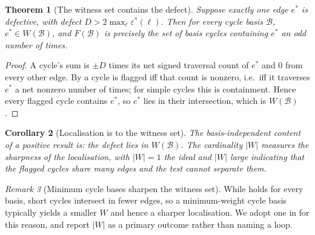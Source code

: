 \documentclass[11pt,twocolumn,a4paper]{article}
\theoremstyle{pstyle}
\newtheorem{theorem}{Theorem}[section]
\newtheorem{corollary}[theorem]{Corollary}
\theoremstyle{definition}
\theoremstyle{remark}
\newtheorem{remark}[theorem]{Remark}
\newcommand{\abs}[1]{\lvert#1\rvert}
\newcommand{\eps}{\varepsilon}
\newcommand{\epsstar}{\eps^{\ast}}
\begin{document}
\begin{theorem}[The witness set contains the defect]
\label{thm:witness-contains}
Suppose exactly one edge $e^{\ast}$ is defective, with defect $D >
2\max_\ell \epsstar(\ell)$. Then for every cycle basis $\mathcal{B}$,
$e^{\ast}\in W(\mathcal{B})$, and $F(\mathcal{B})$ is precisely the set
of basis cycles containing $e^{\ast}$ an odd number of times.
\end{theorem}

\begin{proof}
A cycle's sum is $\pm D$ times its net signed traversal count of
$e^{\ast}$ and $0$ from every other edge. By  a
cycle is flagged iff that count is nonzero, i.e.\ iff it traverses
$e^{\ast}$ a net nonzero number of times; for simple cycles this is
containment. Hence every flagged cycle contains $e^{\ast}$, so
$e^{\ast}$ lies in their intersection, which is $W(\mathcal{B})$.
\end{proof}

\begin{corollary}[Localisation is to the witness set]
\label{cor:localise-witness}
The basis-independent content of a positive result is: the defect lies
in $W(\mathcal{B})$. The cardinality $\abs{W}$ measures the sharpness of
the localisation, with $\abs{W}=1$ the ideal and $\abs{W}$ large
indicating that the flagged cycles share many edges and the test cannot
separate them.
\end{corollary}

\begin{remark}[Minimum cycle bases sharpen the witness set]
\label{rem:mcb}
While  holds for every basis, short cycles
intersect in fewer edges, so a minimum-weight cycle basis
\citep{horton1987,kavitha2009} typically yields a smaller $W$ and hence
a sharper localisation. We adopt one in  for this
reason, and report $\abs{W}$ as a primary outcome rather than naming a
loop.
\end{remark}
\end{document}
